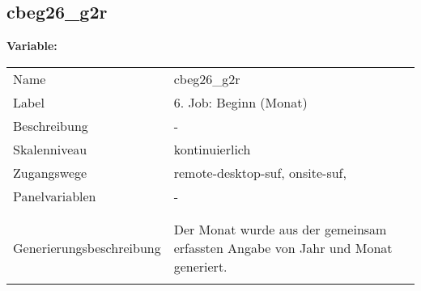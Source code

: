 	
	
	\subsection{cbeg26\_g2r}
	\label{subSection:cbeg26_g2r}

	\noindent\textbf{Variable:}\\
		\begin{tabular}{lL{11.3cm}}
			\label{tableVariable:cbeg26_g2r}
			Name & cbeg26\_g2r \\
			Label & 6. Job: Beginn (Monat) \\
			Beschreibung & - \\
			Skalenniveau & kontinuierlich \\
			Zugangswege &
				remote-desktop-suf,
				onsite-suf,
 \\
			Panelvariablen & -
			 \\
			 \\
 \\
					Generierungsbeschreibung & Der Monat wurde aus der gemeinsam erfassten Angabe von Jahr und Monat generiert. 
				 \\	
			 \\
		\end{tabular}






